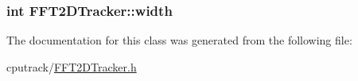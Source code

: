 \subsubsection[{\texorpdfstring{width}{width}}]{\setlength{\rightskip}{0pt plus 5cm}int F\+F\+T2\+D\+Tracker\+::width}\hypertarget{class_f_f_t2_d_tracker_a3e9fc0e59543897aa47e4f195ed407a1}{}\label{class_f_f_t2_d_tracker_a3e9fc0e59543897aa47e4f195ed407a1}


The documentation for this class was generated from the following file\+:\begin{DoxyCompactItemize}
\item 
cputrack/\hyperlink{_f_f_t2_d_tracker_8h}{F\+F\+T2\+D\+Tracker.\+h}\end{DoxyCompactItemize}
